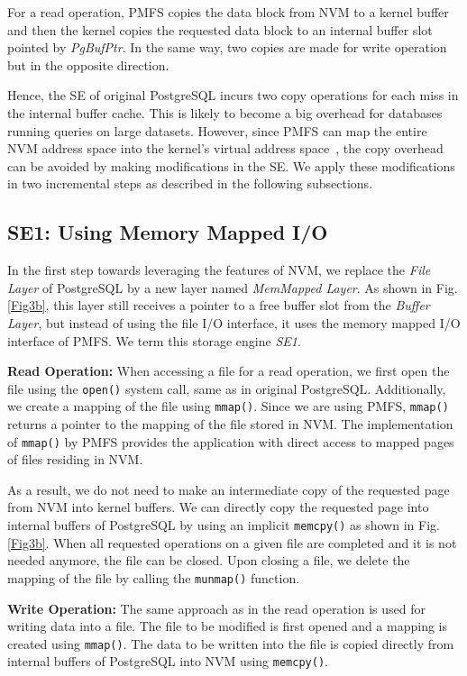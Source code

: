 For a read operation, PMFS copies the data block from NVM to a kernel buffer and then the kernel copies the requested 
data block to an internal buffer slot pointed by \textit{PgBufPtr}. In the same way, two copies are made for write operation but in the opposite direction.

Hence, the SE of original PostgreSQL incurs two copy operations for each miss in the internal buffer cache. This is 
likely to become a big overhead for databases running queries on large datasets. However, since PMFS can map the entire NVM address space into the kernel's virtual address space~\cite{dulloor2014system}, the copy overhead can be avoided by making modifications in the SE. We apply these modifications in two incremental steps as described in 
the following subsections.

\subsection{SE1: Using Memory Mapped I/O}
In the first step towards leveraging the features of NVM, we replace the \textit{File Layer} of PostgreSQL by a 
new layer named \textit{MemMapped Layer}. As shown in Fig. \ref{Fig3b}, this layer still receives a pointer 
to a free buffer slot from the \textit{Buffer Layer}, but instead of using the file I/O interface, it uses the memory 
mapped I/O interface of PMFS. We term this storage engine \textit{SE1}.

\noindent\textbf{Read Operation:} When accessing a file for a read operation, we first open the file using the \verb+open()+ 
system call, same as in original PostgreSQL. Additionally, we create a mapping of the file using \verb+mmap()+. 
Since we are using PMFS, \verb+mmap()+ returns a pointer to the mapping of the file stored in NVM. The implementation of \verb+mmap()+ by PMFS provides the application with direct access to mapped pages of files residing in NVM.

As a result, we do not need to make an intermediate copy of the requested page from NVM into kernel buffers. We can 
directly copy the requested page into internal buffers of PostgreSQL by using an implicit \verb+memcpy()+ as shown in Fig. \ref{Fig3b}. When all requested operations on a given file are completed and it is not needed anymore, 
the file can be closed. Upon closing a file, we delete the mapping of the file by calling the \verb+munmap()+ function. 

\noindent\textbf{Write Operation:} The same approach as in the read operation is used for writing data into a file. The file to be modified is first opened and a mapping is created using \verb+mmap()+. The data to be written into the file is copied 
directly from internal buffers of PostgreSQL into NVM using \verb+memcpy()+.

